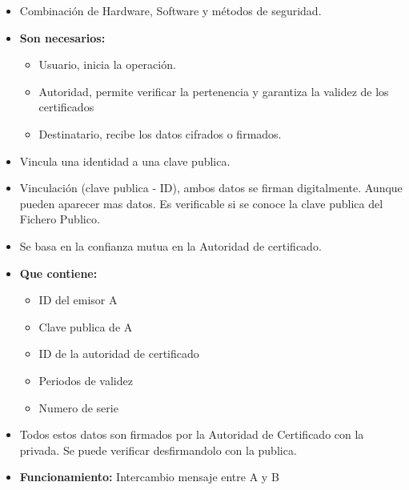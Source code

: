 \documentclass[12pt, twoside, openright]{report} %
\begin{document}
  \begin{itemize}
  \item Combinación de Hardware, Software y métodos de seguridad.
    
  \item \textbf{Son necesarios:}
    

    \begin{itemize}
    \item Usuario, inicia la operación.
      
    \item Autoridad, permite verificar la pertenencia y garantiza la validez
      de los certificados
      
    \item Destinatario, recibe los datos cifrados o firmados.
      
    \end{itemize}
  \item Vincula una identidad a una clave publica.
    
  \item Vinculación (clave publica - ID), ambos datos se firman
    digitalmente. Aunque pueden aparecer mas datos. Es verificable si se
    conoce la clave publica del Fichero Publico.
    
  \item Se basa en la confianza mutua en la Autoridad de certificado.
    
  \item \textbf{Que contiene:}
    

    \begin{itemize}
    \item ID del emisor A
      
    \item Clave publica de A
      
    \item ID de la autoridad de certificado
      
    \item Periodos de validez
      
    \item Numero de serie
      
    \end{itemize}
  \item Todos estos datos son firmados por la Autoridad de Certificado con
    la privada. Se puede verificar desfirmandolo con la publica.
    
  \item \textbf{Funcionamiento:} Intercambio mensaje entre A y B
    


\end{itemize}
\end{document}
